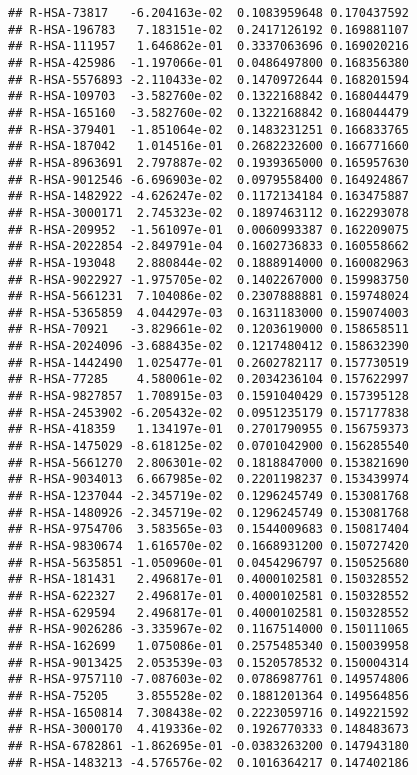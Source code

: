 \documentclass[
]{article}
\begin{document}
\begin{verbatim}
## R-HSA-73817   -6.204163e-02  0.1083959648 0.170437592
## R-HSA-196783   7.183151e-02  0.2417126192 0.169881107
## R-HSA-111957   1.646862e-01  0.3337063696 0.169020216
## R-HSA-425986  -1.197066e-01  0.0486497800 0.168356380
## R-HSA-5576893 -2.110433e-02  0.1470972644 0.168201594
## R-HSA-109703  -3.582760e-02  0.1322168842 0.168044479
## R-HSA-165160  -3.582760e-02  0.1322168842 0.168044479
## R-HSA-379401  -1.851064e-02  0.1483231251 0.166833765
## R-HSA-187042   1.014516e-01  0.2682232600 0.166771660
## R-HSA-8963691  2.797887e-02  0.1939365000 0.165957630
## R-HSA-9012546 -6.696903e-02  0.0979558400 0.164924867
## R-HSA-1482922 -4.626247e-02  0.1172134184 0.163475887
## R-HSA-3000171  2.745323e-02  0.1897463112 0.162293078
## R-HSA-209952  -1.561097e-01  0.0060993387 0.162209075
## R-HSA-2022854 -2.849791e-04  0.1602736833 0.160558662
## R-HSA-193048   2.880844e-02  0.1888914000 0.160082963
## R-HSA-9022927 -1.975705e-02  0.1402267000 0.159983750
## R-HSA-5661231  7.104086e-02  0.2307888881 0.159748024
## R-HSA-5365859  4.044297e-03  0.1631183000 0.159074003
## R-HSA-70921   -3.829661e-02  0.1203619000 0.158658511
## R-HSA-2024096 -3.688435e-02  0.1217480412 0.158632390
## R-HSA-1442490  1.025477e-01  0.2602782117 0.157730519
## R-HSA-77285    4.580061e-02  0.2034236104 0.157622997
## R-HSA-9827857  1.708915e-03  0.1591040429 0.157395128
## R-HSA-2453902 -6.205432e-02  0.0951235179 0.157177838
## R-HSA-418359   1.134197e-01  0.2701790955 0.156759373
## R-HSA-1475029 -8.618125e-02  0.0701042900 0.156285540
## R-HSA-5661270  2.806301e-02  0.1818847000 0.153821690
## R-HSA-9034013  6.667985e-02  0.2201198237 0.153439974
## R-HSA-1237044 -2.345719e-02  0.1296245749 0.153081768
## R-HSA-1480926 -2.345719e-02  0.1296245749 0.153081768
## R-HSA-9754706  3.583565e-03  0.1544009683 0.150817404
## R-HSA-9830674  1.616570e-02  0.1668931200 0.150727420
## R-HSA-5635851 -1.050960e-01  0.0454296797 0.150525680
## R-HSA-181431   2.496817e-01  0.4000102581 0.150328552
## R-HSA-622327   2.496817e-01  0.4000102581 0.150328552
## R-HSA-629594   2.496817e-01  0.4000102581 0.150328552
## R-HSA-9026286 -3.335967e-02  0.1167514000 0.150111065
## R-HSA-162699   1.075086e-01  0.2575485340 0.150039958
## R-HSA-9013425  2.053539e-03  0.1520578532 0.150004314
## R-HSA-9757110 -7.087603e-02  0.0786987761 0.149574806
## R-HSA-75205    3.855528e-02  0.1881201364 0.149564856
## R-HSA-1650814  7.308438e-02  0.2223059716 0.149221592
## R-HSA-3000170  4.419336e-02  0.1926770333 0.148483673
## R-HSA-6782861 -1.862695e-01 -0.0383263200 0.147943180
## R-HSA-1483213 -4.576576e-02  0.1016364217 0.147402186

\end{verbatim}
\end{document}
